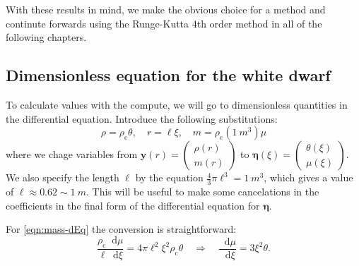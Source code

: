 \documentclass[]{article}
\newcommand{\dd}{\mathop{}\!\mathrm{d}}
\renewcommand{\vec}[1]{\boldsymbol{#1}}
\newcommand{\rhoCentre}{\rho_\mathrm{c}}
\begin{document}
	With these results in mind, we make the obvious choice for a method and continute forwards using the Runge-Kutta 4th order method in all of the following chapters.


\subsection{Dimensionless equation for the white dwarf}
	To calculate values with the compute, we will go to dimensionless quantities in the differential equation. Introduce the following substitutions:
	\begin{equation}
		\rho = \rhoCentre \theta, \quad r = \ell \xi, \quad m = \rhoCentre (\SI{1}{m^3}) \mu
	\end{equation}
	where we chage variables from $\vec{y}(r) = \begin{pmatrix}\rho(r) \\ m(r)\end{pmatrix}$ to $\vec{\eta}(\xi) = \begin{pmatrix}\theta(\xi)\\\mu(\xi)\end{pmatrix}$. We also specify the length $\ell$ by the equation $\frac{4}{3}\pi \ell^3 = \SI{1}{m^3}$, which gives a value of $\ell \approx 0.62 \sim \SI{1}{m}$. This will be useful to make some cancelations in the coefficients in the final form of the differential equation for $\vec{\eta}$.

	For \eqref{eqn:mass-dEq}  the conversion is straightforward:
	\begin{equation}
		\frac{\rhoCentre \dd \mu}{\ell \dd \xi} = 4 \pi \ell^2 \xi^2 \rhoCentre \theta \quad \Rightarrow \quad \frac{\dd \mu}{\dd \xi} = 3 \xi^2 \theta.
	\end{equation}
\end{document}

